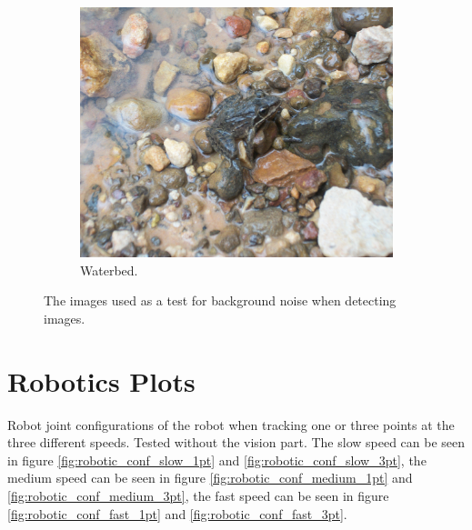 \begin{figure}[h]
  \begin{subfigure}{\exampleWidth}  \includegraphics[width=\linewidth]{graphics/texture3} \caption{Waterbed.}         \label{fig:scene_waterb} \end{subfigure}
  \caption{The images used as a test for background noise when detecting images.}
  \label{fig:backgrounds}
\end{figure}

\section{Robotics Plots}
\label{app:joint_positions_robotic_part}

Robot joint configurations of the robot when tracking one or three points at the three different speeds.
Tested without the vision part.
The slow speed can be seen in figure \ref{fig:robotic_conf_slow_1pt} and \ref{fig:robotic_conf_slow_3pt}, 
the medium speed can be seen in figure \ref{fig:robotic_conf_medium_1pt} and \ref{fig:robotic_conf_medium_3pt},
the fast speed can be seen in figure \ref{fig:robotic_conf_fast_1pt} and \ref{fig:robotic_conf_fast_3pt}.

